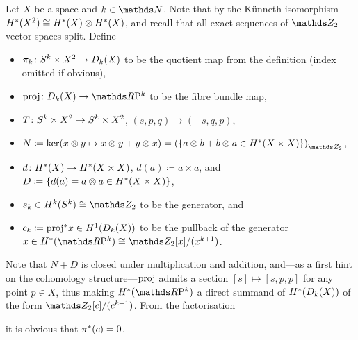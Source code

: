 \begin{Def}
  Let $X$ be a space and $k\in\Nat$.
  Note that by the Künneth isomorphism
  $H^*(X^2)\cong H^*(X)\otimes H^*(X)$, and recall that all exact
  sequences of $\Zmod2$-vector spaces split.
  Define
  \begin{itemize}
  \item
    $\pi_k\colon S^{k}\times X^2\to D_{k}({X})$
    to be the quotient map from the definition (index omitted if
    obvious),
  \item
    $\proj\colon\Twistedprod k X\to \RP k$
    to be the fibre bundle map,
  \item
    $T\colon S^{k}\times X^2\to S^{k}\times X^2$,
    $(s,p,q)\mapsto(-s,q,p)$,
  \item
    $N\coloneqq
    \ker(x\otimes y\mapsto x\otimes y + y\otimes x)
    = \left(\left\{
        a\otimes b + b\otimes a
        \in \H^*(X\times X)
      \right\}\right)_{\Zmod2}$,
  \item
    $d\colon H^*(X)\to H^*(X\times X)$,
    $d(a)\coloneqq a\times a$, and
    $D\coloneqq
    \left\{ d(a)=a\otimes a \in H^*(X\times X) \right\}$,
  \item
    $s_k\in\H^k(\Sphere k)\cong\Zmod2$ to be the generator, and
  \item
    $c_k\coloneqq {\mathrm{proj}}^* x\in H^1(D_{k}({X}))$ to be the
    pullback of the generator $x\in\H^*(\RP k)\cong\Zmod2[x]/(x^{k+1})$.
  \end{itemize}
\end{Def}
\begin{Rem}
  Note that $N+D$ is closed under multiplication and addition,
  and---as a first hint on the cohomology structure---$\mathrm{proj}$ admits a
  section  $[s]\mapsto[s,p,p]$ for any point $p\in X$, thus making
  $\H^*(\RP k)$ a direct summand of $H^*(D_{k}({X}))$ of the
  form $\Zmod2[c]/(c^{k+1})$.
  From the factorisation
  \begin{center}
  \end{center}
  it is obvious that ${\pi}^*(c)=0$.
\end{Rem}

